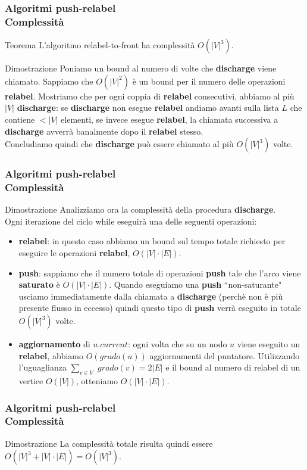 \documentclass{beamer}
\begin{document}
\begin{frame}
\frametitle{Algoritmi push-relabel\\Complessità}
\begin{block}{Teorema}
L'algoritmo relabel-to-front ha complessità $O(|V|^3)$.
\end{block}
\begin{block}{Dimostrazione}
Poniamo un bound al numero di volte che \textbf{discharge} viene chiamato. Sappiamo che $O(|V|^2)$ è un bound per il numero delle operazioni \textbf{relabel}. Mostriamo che per ogni coppia di \textbf{relabel} consecutivi, abbiamo al più $|V|$ \textbf{discharge}: se \textbf{discharge} non esegue \textbf{relabel} andiamo avanti sulla lista $L$ che contiene $<|V|$ elementi, se invece esegue \textbf{relabel}, la chiamata successiva a \textbf{discharge} avverrà banalmente dopo il \textbf{relabel} stesso.\\
Concludiamo quindi che \textbf{discharge} può essere chiamato al più $O(|V|^3)$ volte.
\end{block}
\end{frame}

\begin{frame}
\frametitle{Algoritmi push-relabel\\Complessità}
\begin{block}{Dimostrazione}
Analizziamo ora la complessità della procedura \textbf{discharge}.\\
Ogni iterazione del ciclo while eseguirà una delle seguenti operazioni:\\
\begin{itemize}
\item \textbf{relabel}: in questo caso abbiamo un bound sul tempo totale richiesto per eseguire le operazioni \textbf{relabel}, $O(|V|\cdot|E|)$.
\item \textbf{push}: sappiamo che il numero totale di operazioni \textbf{push} tale che l'arco viene \textbf{saturato} è $O(|V|\cdot|E|)$. Quando eseguiamo una \textbf{push} ``non-saturante" usciamo immediatamente dalla chiamata a \textbf{discharge} (perchè non è più presente flusso in eccesso) quindi questo tipo di \textbf{push} verrà eseguito in totale $O(|V|^3)$ volte.
\item \textbf{aggiornamento} di $u.current$: ogni volta che su un nodo $u$ viene eseguito un \textbf{relabel}, abbiamo $O(grado(u))$ aggiornamenti del puntatore. Utilizzando l'uguaglianza \small$\sum\limits_{v\in V}$ $grado(v)=2|E|$ e il bound al numero di relabel di un vertice $O(|V|)$, otteniamo $O(|V|\cdot|E|)$.
\end{itemize}

\end{block}
\end{frame}

\begin{frame}
\frametitle{Algoritmi push-relabel\\Complessità}
\begin{block}{Dimostrazione}
La complessità totale risulta quindi essere $O(|V|^3+|V|\cdot|E|)=O(|V|^3)$.
\end{block}
\end{frame}
\end{document}
